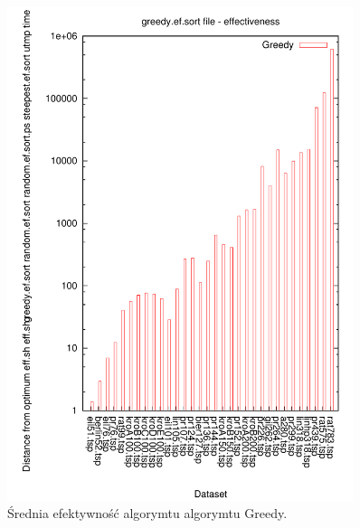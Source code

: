 \begin{figure}
\begin{center}
\includegraphics[width=0.9\textwidth]{wykresy/greedy_ef}
\end{center}
\caption{Średnia efektywność algorymtu  algorymtu Greedy.}
\label{greedy_ef}
\end{figure}


